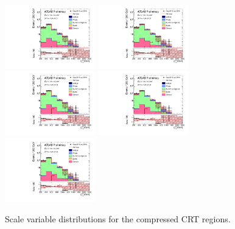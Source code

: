 \clearpage
\begin{figure}[tbph]
\begin{center}
\includegraphics[width=0.35\textwidth]{figures/ATLAS-CONF-2016-078_INT/N-1Plots/AtlasStyle/Preliminary/CRT_SRJigsawSRC1_LastCut_CRT_minusone}
\includegraphics[width=0.35\textwidth]{figures/ATLAS-CONF-2016-078_INT/N-1Plots/AtlasStyle/Preliminary/CRT_SRJigsawSRC2_LastCut_CRT_minusone}
\includegraphics[width=0.35\textwidth]{figures/ATLAS-CONF-2016-078_INT/N-1Plots/AtlasStyle/Preliminary/CRT_SRJigsawSRC3_LastCut_CRT_minusone}
\includegraphics[width=0.35\textwidth]{figures/ATLAS-CONF-2016-078_INT/N-1Plots/AtlasStyle/Preliminary/CRT_SRJigsawSRC4_LastCut_CRT_minusone}
\includegraphics[width=0.35\textwidth]{figures/ATLAS-CONF-2016-078_INT/N-1Plots/AtlasStyle/Preliminary/CRT_SRJigsawSRC5_LastCut_CRT_minusone}
\end{center}
\caption{Scale variable distributions for the compressed CRT regions.}
\label{fig:CRT_SRJigsawSRC2_LastCut_CRT_minusone}
\end{figure}

